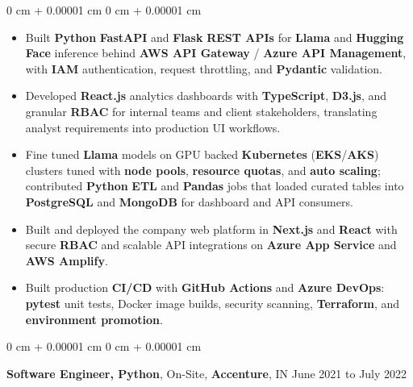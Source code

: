 \documentclass[10pt, letterpaper]{article}
\newenvironment{highlights}{
    \begin{itemize}[
        topsep=0.04 cm,
        parsep=0.04 cm,
        partopsep=0pt,
        itemsep=0pt,
        leftmargin=0 cm + 10pt
    ]
}{
    \end{itemize}
} %
\newenvironment{onecolentry}{
    \begin{adjustwidth}{
        0 cm + 0.00001 cm
    }{
        0 cm + 0.00001 cm
    }
}{
    \end{adjustwidth}
} %
\newcommand{\resumeheading}[2]{%
    \begin{onecolentry}
        #1 \hfill #2
    \end{onecolentry}
} %
\begin{document}
\begin{onecolentry}
\begin{highlights}
	\item Built \textbf{Python} \textbf{FastAPI} and \textbf{Flask} \textbf{REST APIs} for \textbf{Llama} and \textbf{Hugging Face} inference behind \textbf{AWS API Gateway} / \textbf{Azure API Management}, with \textbf{IAM} authentication, request throttling, and \textbf{Pydantic} validation.
	\item Developed \textbf{React.js} analytics dashboards with \textbf{TypeScript}, \textbf{D3.js}, and granular \textbf{RBAC} for internal teams and client stakeholders, translating analyst requirements into production UI workflows.
	\item Fine tuned \textbf{Llama} models on GPU backed \textbf{Kubernetes} (\textbf{EKS}/\textbf{AKS}) clusters tuned with \textbf{node pools}, \textbf{resource quotas}, and \textbf{auto scaling}; contributed \textbf{Python} \textbf{ETL} and \textbf{Pandas} jobs that loaded curated tables into \textbf{PostgreSQL} and \textbf{MongoDB} for dashboard and API consumers.
	\item Built and deployed the company web platform in \textbf{Next.js} and \textbf{React} with secure \textbf{RBAC} and scalable API integrations on \textbf{Azure App Service} and \textbf{AWS Amplify}.
	\item Built production \textbf{CI/CD} with \textbf{GitHub Actions} and \textbf{Azure DevOps}: \textbf{pytest} unit tests, Docker image builds, security scanning, \textbf{Terraform}, and \textbf{environment promotion}.
\end{highlights}
\end{onecolentry}




\vspace{0.15 cm}
\resumeheading{\textbf{Software Engineer, Python}, On-Site, \textbf{Accenture}, IN}{June 2021 to July 2022}
\end{document}
